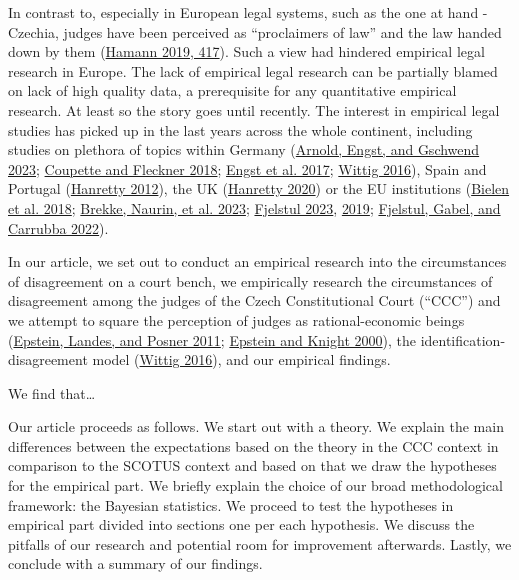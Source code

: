 \documentclass[
  11pt,
]{article}
\begin{document}
In contrast to, especially in European legal systems, such as the one at
hand - Czechia, judges have been perceived as ``proclaimers of law'' and
the law handed down by them
(\protect\hyperlink{ref-hamannGermanFederalCourts2019}{Hamann 2019,
417}). Such a view had hindered empirical legal research in Europe. The
lack of empirical legal research can be partially blamed on lack of high
quality data, a prerequisite for any quantitative empirical research. At
least so the story goes until recently. The interest in empirical legal
studies has picked up in the last years across the whole continent,
including studies on plethora of topics within Germany
(\protect\hyperlink{ref-arnoldScalingCourtDecisions2023}{Arnold, Engst,
and Gschwend 2023};
\protect\hyperlink{ref-coupetteQuantitativeRechtswissenschaft2018}{Coupette
and Fleckner 2018};
\protect\hyperlink{ref-engstEinflussParteinaheAuf2017}{Engst et al.
2017};
\protect\hyperlink{ref-wittigOccurrenceSeparateOpinions2016}{Wittig
2016}), Spain and Portugal
(\protect\hyperlink{ref-hanrettyDissentIberiaIdeal2012}{Hanretty 2012}),
the UK
(\protect\hyperlink{ref-hanrettyCourtSpecialistsJudicial2020}{Hanretty
2020}) or the EU institutions
(\protect\hyperlink{ref-bielenBacklogsLitigationRates2018}{Bielen et al.
2018}; \protect\hyperlink{ref-brekkeThatOrderHow2023}{Brekke, Naurin, et
al. 2023}; \protect\hyperlink{ref-fjelstulHowChamberSystem2023}{Fjelstul
2023}, \protect\hyperlink{ref-fjelstulEvolutionEuropeanUnion2019}{2019};
\protect\hyperlink{ref-fjelstulTimelyAdministrationJustice2022}{Fjelstul,
Gabel, and Carrubba 2022}).

In our article, we set out to conduct an empirical research into the
circumstances of disagreement on a court bench, we empirically research
the circumstances of disagreement among the judges of the Czech
Constitutional Court (``CCC'') and we attempt to square the perception
of judges as rational-economic beings
(\protect\hyperlink{ref-epsteinWhyWhenJudges2011}{Epstein, Landes, and
Posner 2011};
\protect\hyperlink{ref-epsteinStrategicRevolutionJudicial2000}{Epstein
and Knight 2000}), the identification-disagreement model
(\protect\hyperlink{ref-wittigOccurrenceSeparateOpinions2016}{Wittig
2016}), and our empirical findings.

We find that\ldots{}

Our article proceeds as follows. We start out with a theory. We explain
the main differences between the expectations based on the theory in the
CCC context in comparison to the SCOTUS context and based on that we
draw the hypotheses for the empirical part. We briefly explain the
choice of our broad methodological framework: the Bayesian statistics.
We proceed to test the hypotheses in empirical part divided into
sections one per each hypothesis. We discuss the pitfalls of our
research and potential room for improvement afterwards. Lastly, we
conclude with a summary of our findings.
\end{document}
